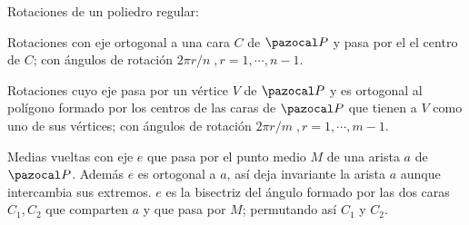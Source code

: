 Rotaciones de un poliedro regular:
\begin{itemizex}
	\item Rotaciones con eje ortogonal a una cara $C$ de $\PP$ y pasa por el el centro de $C$; con ángulos de rotación $2\pi r/n\;,r = 1, \cdots, n-1$.
	\item Rotaciones cuyo eje pasa por un vértice $V$ de $\PP$ y es ortogonal al polígono formado por los centros de las caras de $\PP$ que tienen a $V$ como uno de sus vértices; con ángulos de rotación $2\pi r/m\;,r = 1, \cdots, m-1$.
	\item Medias vueltas con eje $e$ que pasa por el punto medio $M$ de una arista $a$ de $\PP$. Además $e$ es ortogonal a $a$, así deja invariante la arista $a$ aunque intercambia sus extremos. $e$ es la bisectriz del ángulo formado por las dos caras $C_1, C_2$ que comparten $a$ y que pasa por $M$; permutando así $C_1$ y $C_2$.
\end{itemizex}
